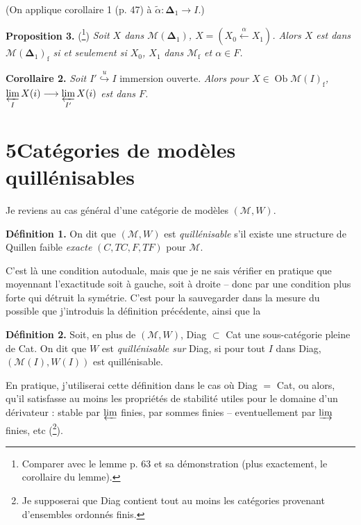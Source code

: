 \documentclass[11pt]{article}
\newcommand{\printedpage}[1]{\marginpar{\footnotesize p.~#1}}
\newcommand{\msp}[1]{\marginpar{\footnotesize [#1]}}
\begin{document}
\printedpage{29}
(On applique corollaire 1 (p. 47) à $\tilde{\alpha} : \boldsymbol{\Delta}_1 \longrightarrow I$.)

\textbf{Proposition 3.} (\footnote[28]{Comparer avec le lemme p. 63 et sa démonstration (plus exactement, le corollaire du lemme).}) \textit{Soit $X$ dans $\mathcal{M}(\boldsymbol{\Delta}_1)$, $X = (X_0 \xleftarrow{\alpha} X_1)$. Alors $X$ est dans $\mathcal{M}(\boldsymbol{\Delta}_1)_{\mathrm{f}}$ si et seulement si $X_0$, $X_1$} \textit{dans $\mathcal{M}_{\mathrm{f}}$ et $\alpha \in F$.}

\textbf{Corollaire 2.} \textit{Soit $I' \overset{u}{\hookrightarrow} I$} immersion ouverte. \textit{Alors pour $X \in \operatorname{Ob}\mathcal{M}(I)_{\mathrm{f}}$, $\varprojlim\limits_{I} X(i) \longrightarrow \varprojlim\limits_{I'} X(i)$ est dans $F$.}

\section*{5\quad Catégories de modèles quillénisables}

Je reviens au cas général d'une catégorie de modèles $(\mathcal{M},W)$.

\textbf{Définition 1.} On dit que $(\mathcal{M},W)$ est \textit{quillénisable} s'il existe une structure de Quillen faible \textit{exacte} $(C,TC,F,TF)$ pour $\mathcal{M}$.

C'est là une condition autoduale, mais que je ne sais vérifier en pratique que moyennant l'exactitude soit à gauche, soit à droite -- donc par une condition plus forte qui détruit la symétrie. C'est pour la sauvegarder dans la mesure du possible que j'introduis la définition précédente, ainsi que la

\textbf{Définition 2.} Soit, en plus de $(\mathcal{M},W)$, Diag $\subset$ Cat une sous-catégorie pleine de Cat. On dit que
\msp{page 51}$W$ est \textit{quillénisable sur} Diag, si pour tout $I$ dans Diag, $(\mathcal{M}(I),W(I))$ est quillénisable.

En pratique, j'utiliserai cette définition dans le cas où Diag $=$ Cat, ou alors, qu'il satisfasse au moins les propriétés de stabilité utiles pour le domaine d'un dérivateur : stable par $\varprojlim$ finies, par sommes finies -- eventuellement par $\varinjlim$ finies, etc (\footnote[29]{Je supposerai que Diag contient tout au moins les catégories provenant d'ensembles ordonnés finis.}). %
\end{document}
